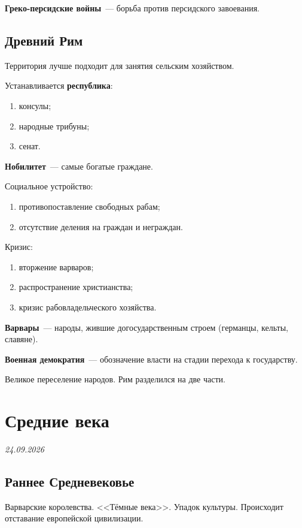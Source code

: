 \documentclass[a4paper, 12pt]{article}
\newcommand{\lecdate}[1]{\vspace{-4pt}\hfill{\small\textit{#1}}\par}
\begin{document}
\textbf{Греко-персидские войны}~--- борьба против персидского завоевания.

\subsection{Древний Рим}
Территория лучше подходит для занятия сельским хозяйством.

Устанавливается \textbf{республика}:
\begin{enumerate}[noitemsep]
  \item консулы;
  \item народные трибуны;
  \item сенат.
\end{enumerate}

\textbf{Нобилитет}~--- самые богатые граждане.

Социальное устройство:
\begin{enumerate}[noitemsep]
  \item противопоставление свободных рабам;
  \item отсутствие деления на граждан и неграждан.
\end{enumerate}

Кризис:
\begin{enumerate}[noitemsep]
  \item вторжение варваров;
  \item распространение христианства;
  \item кризис рабовладельческого хозяйства.
\end{enumerate}

\textbf{Варвары}~--- народы, жившие догосударственным строем (германцы,
кельты, славяне).

\textbf{Военная демократия}~--- обозначение власти на стадии перехода
к государству.

Великое переселение народов. Рим разделился на две части.

\section{Средние века}
\lecdate{24.09.2026}

\subsection{Раннее Средневековье}
Варварские королевства. <<Тёмные века>>. Упадок культуры. Происходит
отставание европейской цивилизации.
\end{document}
